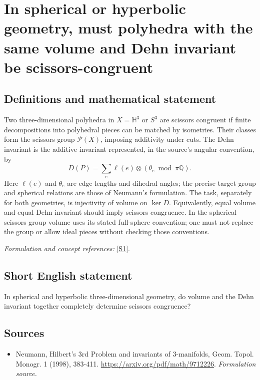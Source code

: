 \documentclass[11pt]{article}
\begin{document}
\section*{\texorpdfstring{In spherical or hyperbolic geometry, must polyhedra with the same volume and Dehn invariant be scissors-congruent}{In spherical or hyperbolic geometry, must polyhedra with the same volume and Dehn invariant be scissors-congruent}}\label{7200010}
\subsection{Definitions and mathematical statement}
Two three-dimensional polyhedra in $X=\mathbb H^3$ or $S^3$ are scissors congruent if finite decompositions into polyhedral pieces can be matched by isometries. Their classes form the scissors group $\mathcal P(X)$, imposing additivity under cuts. The Dehn invariant is the additive invariant represented, in the source's angular convention, by
\[
 D(P)=\sum_{e}\ell(e)\otimes(\theta_e\bmod\pi{\mathbb{Q}}).
\]
Here $\ell(e)$ and $\theta_e$ are edge lengths and dihedral angles; the precise target group and spherical relations are those of Neumann's formulation. The task, separately for both geometries, is injectivity of volume on $\ker D$. Equivalently, equal volume and equal Dehn invariant should imply scissors congruence. In the spherical scissors group volume uses its stated full-sphere convention; one must not replace the group or allow ideal pieces without checking those conventions.
\par\smallskip\textit{Formulation and concept references:} \href{https://arxiv.org/pdf/math/9712226}{[S1]}.

\subsection{Short English statement}
In spherical and hyperbolic three-dimensional geometry, do volume and the Dehn invariant together completely determine scissors congruence?
\subsection{Sources}
\begin{itemize}
\item[S1]Neumann, Hilbert's 3rd Problem and invariants of 3-manifolds, Geom. Topol. Monogr. 1 (1998), 383-411.
\url{https://arxiv.org/pdf/math/9712226}.
\textit{Formulation source.}
\end{itemize}
\end{document}
